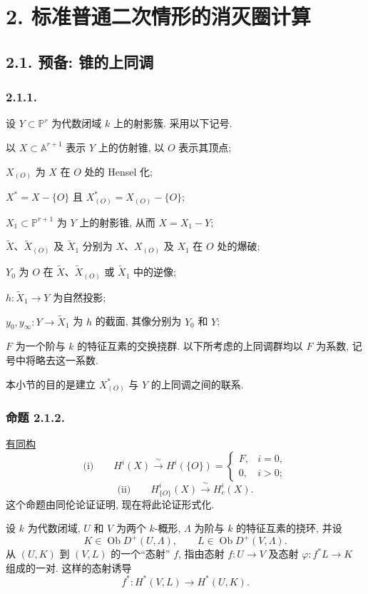 \section*{2. 标准普通二次情形的消灭圈计算}

\subsection*{2.1. 预备: 锥的上同调}

\subsubsection*{2.1.1.}
设 $Y\subset\mathbb P^r$ 为代数闭域 $k$ 上的射影簇. 采用以下记号.

以 $X\subset\mathbb A^{r+1}$ 表示 $Y$ 上的仿射锥, 以 $O$ 表示其顶点;

$X_{(O)}$ 为 $X$ 在 $O$ 处的 Hensel 化;

$X^*=X-\{O\}$ 且 $X^*_{(O)}=X_{(O)}-\{O\}$;

$X_1\subset\mathbb P^{r+1}$ 为 $Y$ 上的射影锥, 从而 $X=X_1-Y$;

$\widetilde X$、$\widetilde X_{(O)}$ 及 $\widetilde X_1$ 分别为 $X$、$X_{(O)}$ 及 $X_1$ 在 $O$ 处的爆破;

$Y_0$ 为 $O$ 在 $\widetilde X$、$\widetilde X_{(O)}$ 或 $\widetilde X_1$ 中的逆像;

$h:\widetilde X_1\to Y$ 为自然投影;

$y_0,y_\infty:Y\to\widetilde X_1$ 为 $h$ 的截面, 其像分别为 $Y_0$ 和 $Y$;

$F$ 为一个阶与 $k$ 的特征互素的交换挠群. 以下所考虑的上同调群均以 $F$ 为系数, 记号中将略去这一系数.

本小节的目的是建立 $X^*_{(O)}$ 与 $Y$ 的上同调之间的联系.

\subsubsection*{命题 2.1.2.}
\underline{有同构}
\[
\text{(i)}\qquad
H^i(X)\xrightarrow{\ \sim\ }H^i(\{O\})=
\begin{cases}
F,& i=0,\\
0,& i>0;
\end{cases}
\]
\[
\text{(ii)}\qquad
H^i_{\{O\}}(X)\xrightarrow{\ \sim\ }H^i_c(X).
\]
这个命题由同伦论证证明, 现在将此论证形式化.

设 $k$ 为代数闭域, $U$ 和 $V$ 为两个 $k$-概形, $\Lambda$ 为阶与 $k$ 的特征互素的挠环, 并设
\[
K\in\operatorname{Ob}D^+(U,\Lambda),
\qquad L\in\operatorname{Ob}D^+(V,\Lambda).
\]
从 $(U,K)$ 到 $(V,L)$ 的一个“态射” $f$, 指由态射 $f:U\to V$ 及态射 $\varphi:f^*L\to K$ 组成的一对. 这样的态射诱导
\[
f^*:H^*(V,L)\longrightarrow H^*(U,K).
\]

